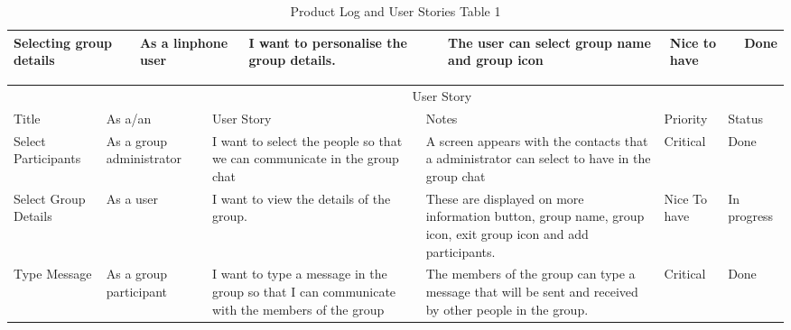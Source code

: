 \documentclass[a4paper]{article}
\begin{document}
\begin{table}[H]
\begin{tabular}{p{1.5cm} p{2.5cm} p{3cm} p{3cm} p{1cm} p{1cm}}
Selecting group details & As a linphone user & I want to personalise the group details.  & The user can select group name and group icon & Nice to have & Done\\ %


\midrule %
\midrule %
\end{tabular}
\caption{Product Log and User Stories Table 1} %
\label{tab:template} %
\end{table}

\vfill

\begin{table}[H]
\begin{tabular}{p{1.5cm} p{2.5cm} p{3cm} p{3cm} p{1cm} p{1cm}} %
\hline %
& \multicolumn{5}{c}{User Story} \\ %
\cmidrule(l){2-6} %
Title & As a/an & User Story & Notes & Priority & Status\\ %
\hline %

Select Participants & As a group administrator & I want to select the people so that we can communicate in the group chat  & A screen appears with the contacts that a administrator can select to have in the group chat & Critical & Done\\ \cmidrule(l){2-6}%

Select Group Details & As a user & I want to view the details of the group. & These are displayed on more information button, group name, group icon, exit group icon and add participants. & Nice To have & In progress\\ \cmidrule(l){2-6}%


Type Message & As a group participant & I want to type a message in the group so that I can communicate with the members of the group& The members of the group can type a message that will be sent and received by other people in the group. & Critical & Done\\ \cmidrule(l){2-6} %


\end{tabular}
\end{table}
\end{document}
